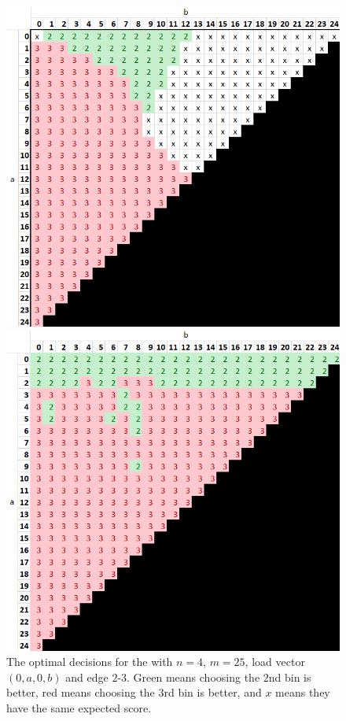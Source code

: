 \begin{figure}
\centering
\begin{minipage}[t]{.48\linewidth}
  \centering
  \includegraphics[scale=0.45]{Chapter4/Figs/0a0b_4_25_analysis.png}
  \caption{The optimal decisions for the \CycleGraph with $n=4$, $m=25$, load vector $(0,a,0,b)$ and edge $2$-$3$. Green means choosing the $2$nd bin is better, red means choosing the $3$rd bin is better, and $x$ means they have the same expected score.}
  \label{greedy-counterexample-analysed}
\end{minipage}\hfill
\begin{minipage}[t]{.48\linewidth}
  \centering
  \includegraphics[scale=0.45]{Chapter4/Figs/0a0b_4_25_analysis_dqn.png}

\end{minipage}
\end{figure}
